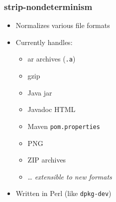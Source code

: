 \documentclass[14pt]{beamer}
\begin{document}
\begin{frame}[plain]
\end{frame}

\begin{frame}[plain]
\end{frame}


\begin{frame}
 \frametitle{strip-nondeterminism}

 \begin{itemize}
  \item Normalizes various file formats
  \item Currently handles:
   \begin{itemize}
    \item ar archives (\texttt{.a})
    \item gzip
    \item Java jar
    \item Javadoc HTML
    \item Maven \texttt{pom.properties}
    \item PNG
    \item ZIP archives
    \item … \textit{extensible to new formats}
   \end{itemize}
  \item Written in Perl (like \texttt{dpkg-dev})
 \end{itemize}
\end{frame}
\end{document}
